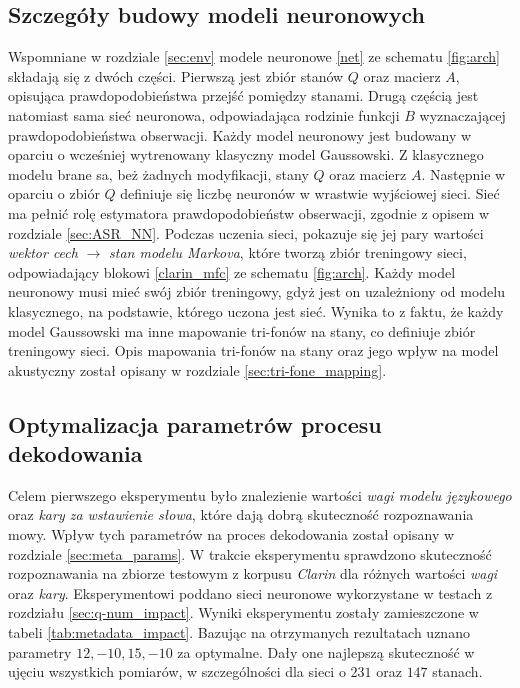 \documentclass[11pt]{article}
\newcommand{\refBlock}[1]{
	\hyperref[#1]{\ref*{#1}}
}
\begin{document}
	\subsection{ Szczegóły budowy modeli neuronowych}
		\label{sec:nn_model_details}
		Wspomniane w rozdziale \ref{sec:env} modele neuronowe \refBlock{net} ze schematu \ref{fig:arch} składają się z dwóch części. Pierwszą jest zbiór stanów $Q$ oraz macierz $A$, opisująca prawdopodobieństwa przejść pomiędzy stanami. Drugą częścią jest natomiast sama sieć neuronowa, odpowiadająca rodzinie funkcji $B$ wyznaczającej prawdopodobieństwa obserwacji. Każdy model neuronowy jest budowany w oparciu o wcześniej wytrenowany klasyczny model Gaussowski. Z klasycznego modelu brane sa, beż żadnych modyfikacji, stany $Q$ oraz macierz $A$. Następnie w oparciu o zbiór $Q$ definiuje się liczbę neuronów w wrastwie wyjściowej sieci. Sieć ma pełnić rolę estymatora prawdopodobieństw obserwacji, zgodnie z opisem w rozdziale \ref{sec:ASR_NN}. Podczas uczenia sieci, pokazuje się jej pary wartości \textit{wektor cech} $\longrightarrow$ \textit{stan modelu Markova}, które tworzą zbiór treningowy sieci, odpowiadający blokowi \refBlock{clarin_mfc} ze schematu \ref{fig:arch}. Każdy model neuronowy musi mieć swój zbiór treningowy, gdyż jest on uzależniony od modelu klasycznego, na podstawie, którego uczona jest sieć. Wynika to z faktu, że każdy model Gaussowski ma inne mapowanie tri-fonów na stany, co definiuje zbiór treningowy sieci. Opis mapowania tri-fonów na stany oraz jego wpływ na model akustyczny został opisany w rozdziale \ref{sec:tri-fone_mapping}.
	
	\subsection{ Optymalizacja parametrów procesu dekodowania }
		\label{sec:metadata_impact}
		Celem pierwszego eksperymentu było znalezienie wartości \textit{wagi modelu językowego} oraz \textit{kary za wstawienie słowa}, które dają dobrą skuteczność rozpoznawania mowy. Wpływ tych parametrów na proces dekodowania został opisany w rozdziale \ref{sec:meta_params}. W trakcie eksperymentu sprawdzono skuteczność rozpoznawania na zbiorze testowym z korpusu \textit{Clarin} dla różnych wartości \textit{wagi} oraz \textit{kary}. Eksperymentowi poddano sieci neuronowe wykorzystane w testach z rozdziału \ref{sec:q-num_impact}. Wyniki eksperymentu zostały zamieszczone w tabeli \ref{tab:metadata_impact}. Bazując na otrzymanych rezultatach uznano parametry $12, -10, 15, -10$ za optymalne. Dały one najlepszą skuteczność w ujęciu wszystkich pomiarów, w szczególności dla sieci o $231$ oraz $147$ stanach.
		
\end{document}
